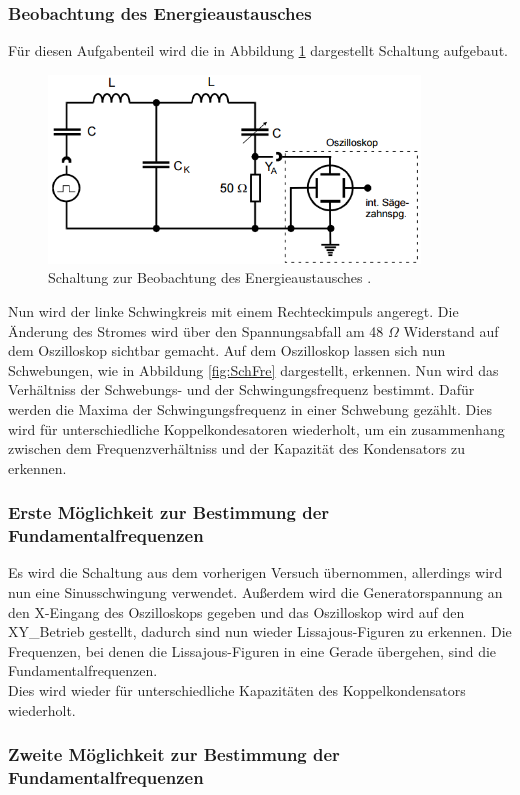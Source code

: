 \subsubsection{Beobachtung des Energieaustausches}
 Für diesen Aufgabenteil wird die in Abbildung \ref{fig:Blub} dargestellt Schaltung aufgebaut.

 \begin{figure}[H]
   \centering
   \includegraphics[height=5cm]{picture/Schwebefrequenz.PNG}
   \caption{Schaltung zur Beobachtung des Energieaustausches \cite{sample}.}
   \label{fig:Blub}
 \end{figure}

Nun wird der linke Schwingkreis mit einem Rechteckimpuls angeregt. Die Änderung des Stromes wird über den Spannungsabfall am 48 $\Omega$ Widerstand auf dem Oszilloskop sichtbar gemacht. Auf dem Oszilloskop lassen sich nun Schwebungen, wie in Abbildung \ref{fig:SchFre} dargestellt, erkennen. Nun wird das Verhältniss der Schwebungs- und der Schwingungsfrequenz bestimmt. Dafür werden die Maxima der Schwingungsfrequenz in einer Schwebung gezählt. Dies wird für unterschiedliche Koppelkondesatoren wiederholt, um ein zusammenhang zwischen dem Frequenzverhältniss und der Kapazität des Kondensators zu erkennen.

\subsubsection{Erste Möglichkeit zur Bestimmung der Fundamentalfrequenzen}
Es wird die Schaltung aus dem vorherigen Versuch übernommen, allerdings wird nun eine Sinusschwingung verwendet. Außerdem wird die Generatorspannung an den X-Eingang des Oszilloskops gegeben und das Oszilloskop wird auf den XY_Betrieb gestellt, dadurch sind nun wieder Lissajous-Figuren zu erkennen. Die Frequenzen, bei denen die Lissajous-Figuren in eine Gerade übergehen, sind die Fundamentalfrequenzen.\\
Dies wird wieder für unterschiedliche Kapazitäten des Koppelkondensators wiederholt.

\subsubsection{Zweite Möglichkeit zur Bestimmung der Fundamentalfrequenzen}
